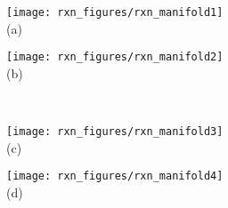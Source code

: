 \documentclass[]{article}
\begin{document}
\centering
\begin{minipage}{0.45\textwidth}
\centering
\texttt{[image: rxn\_figures/rxn\_manifold1]}\\
(a)
\end{minipage}
\begin{minipage}{0.45\textwidth}
\centering
  \texttt{[image: rxn\_figures/rxn\_manifold2]} \\
(b)
\end{minipage}\\
\begin{minipage}{0.45\textwidth}
\centering
  \texttt{[image: rxn\_figures/rxn\_manifold3]} \\
(c)
\end{minipage}
\begin{minipage}{0.45\textwidth}
\centering
  \texttt{[image: rxn\_figures/rxn\_manifold4]} \\
(d)
\end{minipage}
\end{document}
